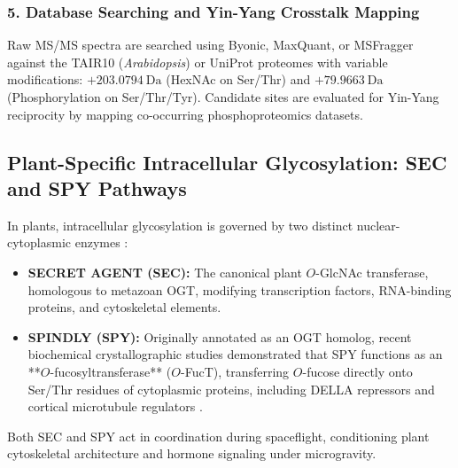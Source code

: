 \subsubsection{5. Database Searching and Yin-Yang Crosstalk Mapping}
Raw MS/MS spectra are searched using Byonic, MaxQuant, or MSFragger against the TAIR10 (\textit{Arabidopsis}) or UniProt proteomes with variable modifications: $+203.0794~\text{Da}$ (HexNAc on Ser/Thr) and $+79.9663~\text{Da}$ (Phosphorylation on Ser/Thr/Tyr). Candidate sites are evaluated for Yin-Yang reciprocity by mapping co-occurring phosphoproteomics datasets.

\subsection{Plant-Specific Intracellular Glycosylation: SEC and SPY Pathways}

In plants, intracellular glycosylation is governed by two distinct nuclear-cytoplasmic enzymes \cite{Hart2007, Olszewski2010}:
\begin{itemize}
    \item \textbf{SECRET AGENT (SEC):} The canonical plant $O$-GlcNAc transferase, homologous to metazoan OGT, modifying transcription factors, RNA-binding proteins, and cytoskeletal elements.
    \item \textbf{SPINDLY (SPY):} Originally annotated as an OGT homolog, recent biochemical crystallographic studies demonstrated that SPY functions as an **$O$-fucosyltransferase** ($O$-FucT), transferring $O$-fucose directly onto Ser/Thr residues of cytoplasmic proteins, including DELLA repressors and cortical microtubule regulators \cite{Zentella2017, Bi2021}.
\end{itemize}
Both SEC and SPY act in coordination during spaceflight, conditioning plant cytoskeletal architecture and hormone signaling under microgravity.
